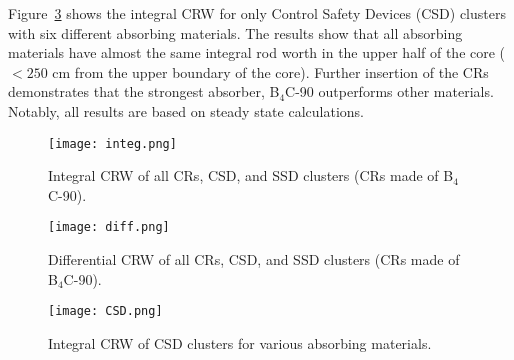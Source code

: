 Figure~\ref{fig:CSD} shows the integral CRW for only Control Safety Devices (CSD) clusters with six 
different absorbing materials. The results show that all absorbing materials 
have almost the same integral rod worth in the upper half of the core 
($<250$ cm from the upper boundary of the core). Further insertion of the 
CRs demonstrates that the strongest absorber, B$_4$C-90 outperforms other materials.
Notably, all results are based on steady state calculations. 

\begin{figure}
	\centering
	\texttt{[image: integ.png]}
	\vspace{-0.5in}
	\caption{Integral CRW of all CRs, CSD, and SSD clusters (CRs made of B$_4$C-90).} 
	\label{fig:integ}
\end{figure}
\begin{figure}
	\centering
	\texttt{[image: diff.png]}
	\vspace{-0.5in}
	\caption{Differential CRW of all CRs, CSD, and SSD clusters (CRs made of B$_4$C-90).} 
	\label{fig:diff}
\end{figure}
\begin{figure}
	\centering
	\texttt{[image: CSD.png]}
	\vspace{-0.5in}
	\caption{Integral CRW of CSD clusters for various absorbing materials.} 
	\label{fig:CSD}
\end{figure}